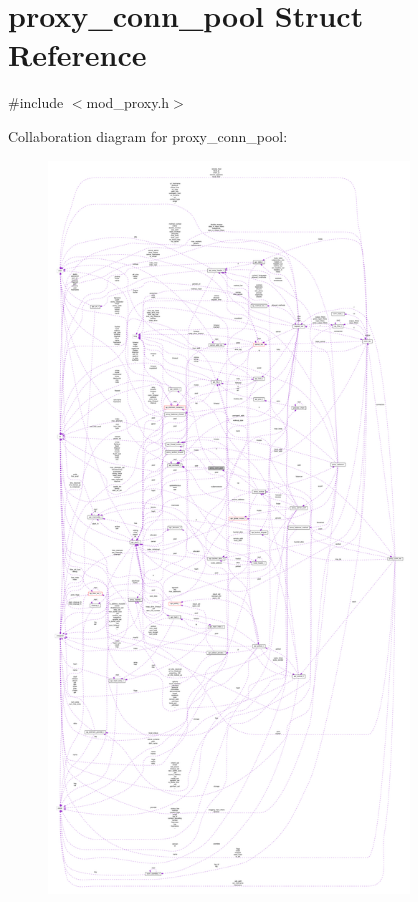 \hypertarget{structproxy__conn__pool}{}\section{proxy\+\_\+conn\+\_\+pool Struct Reference}
\label{structproxy__conn__pool}


{\ttfamily \#include $<$mod\+\_\+proxy.\+h$>$}



Collaboration diagram for proxy\+\_\+conn\+\_\+pool\+:
\nopagebreak
\begin{figure}[H]
\begin{center}
\leavevmode
\includegraphics[height=550pt]{structproxy__conn__pool__coll__graph}
\end{center}
\end{figure}
